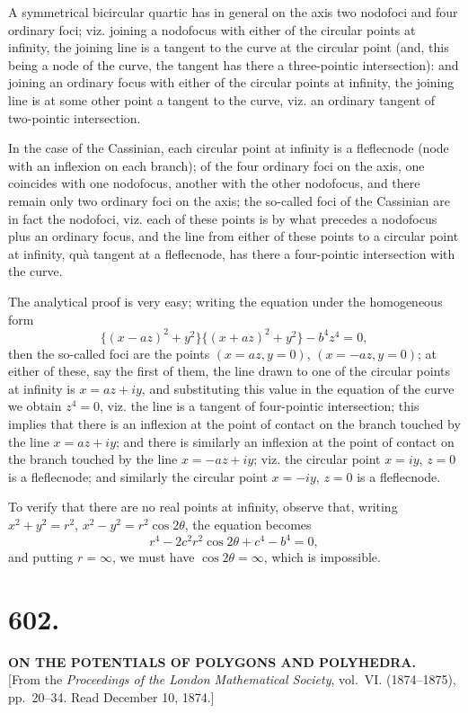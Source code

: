 \documentclass[11pt,a4paper]{article}
\begin{document}
A symmetrical bicircular quartic has in general on the axis two nodofoci
and four ordinary foci; viz. joining a nodofocus with either of the circular
points at infinity, the joining line is a tangent to the curve at the
circular point (and, this being a node of the curve, the tangent has there a
three-pointic intersection): and joining an ordinary focus with either of the
circular points at infinity, the joining line is at some other point a
tangent to the curve, viz. an ordinary tangent of two-pointic intersection.

In the case of the Cassinian, each circular point at infinity is a
fleflecnode (node with an inflexion on each branch); of the four ordinary
foci on the axis, one coincides with one nodofocus, another with the other
nodofocus, and there remain only two ordinary foci on the axis; the
so-called foci of the Cassinian are in fact the nodofoci, viz. each of these
points is by what precedes a nodofocus plus an ordinary focus, and the line
from either of these points to a circular point at infinity, qu\`{a} tangent at
a fleflecnode, has there a four-pointic intersection with the curve.

The analytical proof is very easy; writing the equation under the
homogeneous form
\[
\{(x-az)^2+y^2\} \{(x+az)^2+y^2\} - b^4z^4 = 0,
\]
then the so-called foci are the points $(x=az, y=0)$, $(x=-az, y=0)$; at
either of these, say the first of them, the line drawn to one of the
circular points at infinity is $x=az+iy$, and substituting this value in the
equation of the curve we obtain $z^4=0$, viz. the line is a tangent of
four-pointic intersection; this implies that there is an inflexion at the
point of contact on the branch touched by the line $x=az+iy$; and there is
similarly an inflexion at the point of contact on the branch touched by the
line $x=-az+iy$; viz. the circular point $x=iy$, $z=0$ is a fleflecnode;
and similarly the circular point $x=-iy$, $z=0$ is a fleflecnode.

To verify that there are no real points at infinity, observe that, writing
$x^2+y^2=r^2$, $x^2-y^2=r^2\cos 2\theta$, the equation becomes
\[
r^4 - 2c^2r^2\cos 2\theta + c^4 - b^4 = 0,
\]
and putting $r=\infty$, we must have $\cos 2\theta=\infty$, which is impossible.

\newpage
\section*{602.}
\begin{center}
{\large\bfseries ON THE POTENTIALS OF POLYGONS AND POLYHEDRA.}\\[0.5em]
[From the \textit{Proceedings of the London Mathematical Society}, vol.~VI. (1874--1875),
pp.~20--34. Read December 10, 1874.]
\end{center}
\end{document}

